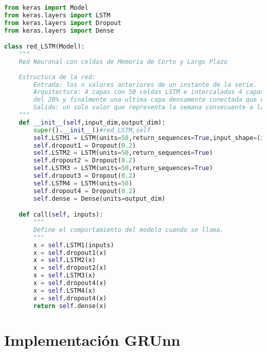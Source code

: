 \begin{lstlisting}[language=Python]
from keras import Model
from keras.layers import LSTM
from keras.layers import Dropout
from keras.layers import Dense

class red_LSTM(Model):
    """
    Red Neuronal con celdas de Memoria de Corto y Largo Plazo
    
    Estructura de la red:
        Entrada: los n valores anteriores de un instante de la serie.
        Arquitectura: 4 capas con 50 celdas LSTM e intercaladas 4 capas de desactivacion (dropout)
        del 20% y finalmente una ultima capa densamente conectada que comprende una sola neurona. 
        Salida: un solo valor que representa la semana consecuente a las n de entrada.
    """
    def __init__(self,input_dim,output_dim):
        super().__init__()#red_LSTM,self
        self.LSTM1 = LSTM(units=50,return_sequences=True,input_shape=(input_dim, 1))
        self.dropout1 = Dropout(0.2)
        self.LSTM2 = LSTM(units=50,return_sequences=True)
        self.dropout2 = Dropout(0.2)
        self.LSTM3 = LSTM(units=50,return_sequences=True)
        self.dropout3 = Dropout(0.2)
        self.LSTM4 = LSTM(units=50)
        self.dropout4 = Dropout(0.2)
        self.dense = Dense(units=output_dim)

    def call(self, inputs):
        """
        Define el comportamiento del modelo cuando se llama.
        """
        x = self.LSTM1(inputs)
        x = self.dropout1(x)
        x = self.LSTM2(x)
        x = self.dropout2(x)
        x = self.LSTM3(x)
        x = self.dropout4(x)
        x = self.LSTM4(x)
        x = self.dropout4(x)
        return self.dense(x)
\end{lstlisting}

\section{Implementación GRUnn}

